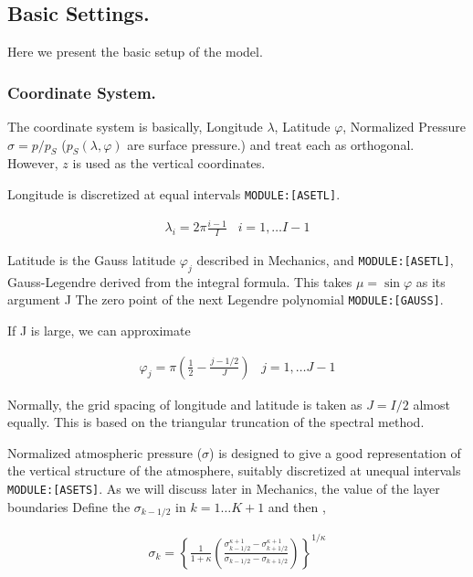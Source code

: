\hypertarget{basic-settings.}{%
\subsection{Basic Settings.}\label{basic-settings.}}

Here we present the basic setup of the model.

\hypertarget{coordinate-system.}{%
\subsubsection{Coordinate System.}\label{coordinate-system.}}

The coordinate system is basically, Longitude \(\lambda\), Latitude
\(\varphi\), Normalized Pressure \(\sigma = p/p_S\)
(\(p_S(\lambda,\varphi)\) are surface pressure.) and treat each as
orthogonal. However, \(z\) is used as the vertical coordinates.

Longitude is discretized at equal intervals \texttt{MODULE:{[}ASETL{]}}.

\begin{eqnarray}
  \lambda_i = 2 \pi \frac{i-1}{I}  \;\;\; i = 1, \ldots I-1
\end{eqnarray}

Latitude is the Gauss latitude \(\varphi_j\) described in Mechanics, and
\texttt{MODULE:{[}ASETL{]}}, Gauss-Legendre derived from the integral
formula. This takes \(\mu = \sin \varphi\) as its argument J The zero
point of the next Legendre polynomial \texttt{MODULE:{[}GAUSS{]}}.

If J is large, we can approximate

\begin{eqnarray}
  \varphi_j =  \pi ( \frac{1}{2}- \frac{j-1/2}{J} ) \;\;\; j = 1, \ldots J-1
\end{eqnarray}

Normally, the grid spacing of longitude and latitude is taken as
\(J = I/2\) almost equally. This is based on the triangular truncation
of the spectral method.

Normalized atmospheric pressure (\(\sigma\)) is designed to give a good
representation of the vertical structure of the atmosphere, suitably
discretized at unequal intervals \texttt{MODULE:{[}ASETS{]}}. As we will
discuss later in Mechanics, the value of the layer boundaries Define the
\(\sigma_{k-1/2}\) in \(k = 1 \ldots K+1\) and then ,

\begin{eqnarray}
 \sigma_k = \left\{ \frac{1}{1+\kappa}
                     \left( \frac{  \sigma^{\kappa +1}_{k-1/2}
                                  - \sigma^{\kappa +1}_{k+1/2}      }
                                  { \sigma_{k-1/2} - \sigma_{k+1/2} }
                     \right)
              \right\}^{1/\kappa}
\end{eqnarray}

